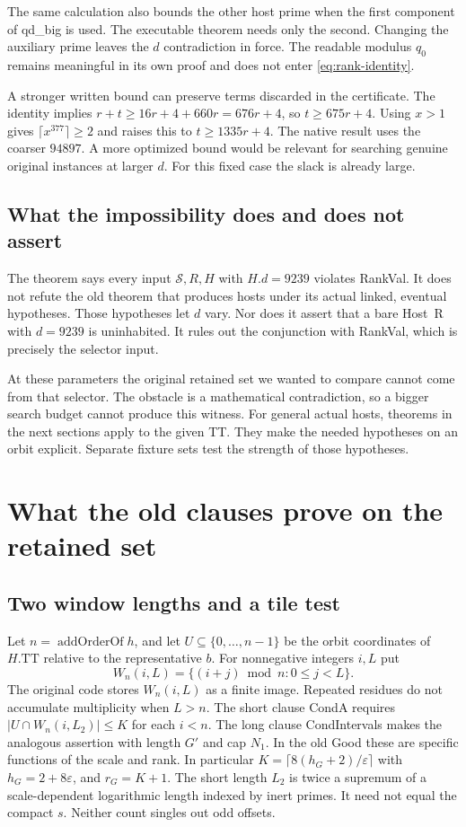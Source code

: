 \documentclass[12pt,letterpaper]{article}
\DeclareRobustCommand{\id}[1]{\mbox{\small\ttfamily #1}}
\begin{document}
The same calculation also bounds the other host prime when the first component of \id{qd\_big} is used. The executable theorem needs only the second. Changing the auxiliary prime leaves the $d$ contradiction in force. The readable modulus $q_0$ remains meaningful in its own proof and does not enter \eqref{eq:rank-identity}.

A stronger written bound can preserve terms discarded in the certificate. The identity implies $r+t\ge16r+4+660r=676r+4$, so \(t\ge675r+4\). Using $x>1$ gives $\lceil x^{377}\rceil\ge2$ and raises this to \(t\ge1335r+4\). The native result uses the coarser $94897$. A more optimized bound would be relevant for searching genuine original instances at larger $d$. For this fixed case the slack is already large.

\subsection{What the impossibility does and does not assert}

The theorem says every input \(\mathcal S,R,H\) with \(H.d=9239\) violates \id{RankVal}. It does not refute the old theorem that produces hosts under its actual linked, eventual hypotheses. Those hypotheses let $d$ vary. Nor does it assert that a bare \id{Host R} with $d=9239$ is uninhabited. It rules out the conjunction with \id{RankVal}, which is precisely the selector input.

At these parameters the original retained set we wanted to compare cannot come from that selector. The obstacle is a mathematical contradiction, so a bigger search budget cannot produce this witness. For general actual hosts, theorems in the next sections apply to the given \id{TT}. They make the needed hypotheses on an orbit explicit. Separate fixture sets test the strength of those hypotheses.

\section{What the old clauses prove on the retained set}
\label{sec:old}

\subsection{Two window lengths and a tile test}

Let $n=\operatorname{addOrderOf}h$, and let $U\subseteq\{0,\ldots,n-1\}$ be the orbit coordinates of $H.\mathrm{TT}$ relative to the representative $b$. For nonnegative integers $i,L$ put
\[
  W_n(i,L)=\{(i+j)\bmod n:0\le j<L\}.
\]
The original code stores $W_n(i,L)$ as a finite image. Repeated residues do not accumulate multiplicity when $L>n$. The short clause \id{CondA} requires \(|U\cap W_n(i,L_2)|\le K\) for each $i<n$. The long clause \id{CondIntervals} makes the analogous assertion with length $G'$ and cap $N_1$. In the old \id{Good} these are specific functions of the scale and rank. In particular \(K=\lceil 8(h_G+2)/\varepsilon\rceil\) with $h_G=2+8\varepsilon$, and \(r_G=K+1\). The short length $L_2$ is twice a supremum of a scale-dependent logarithmic length indexed by inert primes. It need not equal the compact $s$. Neither count singles out odd offsets.
\end{document}
